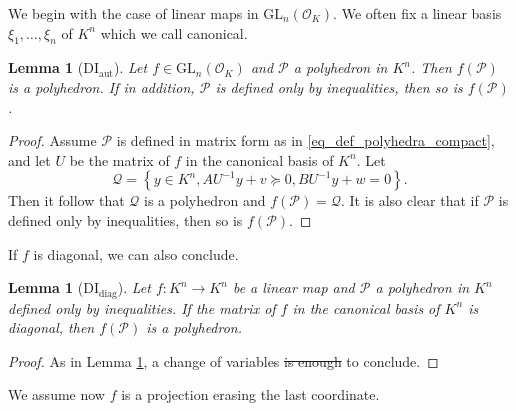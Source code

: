 \documentclass[sigconf]{acmart}
\newcommand{\PP}{\mathcal{P}}
\newcommand{\Qc}{\mathcal{Q}}
\newtheorem{lemma}[theorem]{Lemma}
\newcommand{\OK}{\mathcal{O}_K}
\newcommand{\GL}{\mathrm{GL}}
\providecommand{\DIFaddtex}[1]{{\protect\color{blue}\uwave{#1}}} %
\providecommand{\DIFdeltex}[1]{{\protect\color{red}\sout{#1}}}                      %
\providecommand{\DIFaddbegin}{} %
\providecommand{\DIFaddend}{} %
\providecommand{\DIFdelbegin}{} %
\providecommand{\DIFdelend}{} %
\providecommand{\DIFadd}[1]{\texorpdfstring{\DIFaddtex{#1}}{#1}} %
\providecommand{\DIFdel}[1]{\texorpdfstring{\DIFdeltex{#1}}{}} %
\newcommand{\DIFscaledelfig}{0.5}
\newlength{\DIFdelgraphicswidth} %
\newlength{\DIFdelgraphicsheight} %
\newcommand{\DIFaddincludegraphics}[2][]{{\color{blue}\fbox{\DIFOincludegraphics[#1]{#2}}}} %
\newcommand{\DIFdelincludegraphics}[2][]{%
\sbox{\DIFdelgraphicsbox}{\DIFOincludegraphics[#1]{#2}}%
\settoboxwidth{\DIFdelgraphicswidth}{\DIFdelgraphicsbox} %
\settoboxtotalheight{\DIFdelgraphicsheight}{\DIFdelgraphicsbox} %
\scalebox{\DIFscaledelfig}{%
\parbox[b]{\DIFdelgraphicswidth}{\usebox{\DIFdelgraphicsbox}\\[-\baselineskip] \rule{\DIFdelgraphicswidth}{0em}}\llap{\resizebox{\DIFdelgraphicswidth}{\DIFdelgraphicsheight}{%
\setlength{\unitlength}{\DIFdelgraphicswidth}%
\begin{picture}(1,1)%
\thicklines\linethickness{2pt} %
{\color[rgb]{1,0,0}\put(0,0){\framebox(1,1){}}}%
{\color[rgb]{1,0,0}\put(0,0){\line( 1,1){1}}}%
{\color[rgb]{1,0,0}\put(0,1){\line(1,-1){1}}}%
\end{picture}%
}\hspace*{3pt}}} %
} %
\DeclareRobustCommand{\DIFaddbegin}{\DIFOaddbegin \let\includegraphics\DIFaddincludegraphics} %
\DeclareRobustCommand{\DIFaddend}{\DIFOaddend \let\includegraphics\DIFOincludegraphics} %
\DeclareRobustCommand{\DIFdelbegin}{\DIFOdelbegin \let\includegraphics\DIFdelincludegraphics} %
\DeclareRobustCommand{\DIFdelend}{\DIFOaddend \let\includegraphics\DIFOincludegraphics} %
\begin{document}
We begin with the case of linear maps in $\GL_n(\OK)$.
We often fix a linear basis $\xi_1,\ldots,\xi_n$ of $K^n$ which we call canonical.

\begin{lemma}[DI${}_{\mathrm{aut}}$]
Let $f \in \GL_n(\OK)$ and $\PP$ a polyhedron in $K^n$.
Then $f(\PP)$ is a polyhedron. \label{lem:DIaut}
If in addition, $\PP$ is defined only by inequalities,
then so is $f(\PP)$.
\end{lemma}
\begin{proof}
  Assume $\PP$ is defined in matrix form as in \eqref{eq_def_polyhedra_compact},
  and let $U$ be the matrix of
  $f$ in the canonical basis of $K^n$. Let
  \[\Qc=\left\lbrace y \in K^n,  AU^{-1} y+v \succeq 0, BU^{-1} y+w=0 \right\rbrace.\]
  Then it follow that $\Qc$ is a polyhedron and $f(\PP)=\Qc.$
  It is also clear that if $\PP$ is defined only by inequalities,
  then so is $f(\PP)$.
\end{proof}

If $f$ is diagonal, we can also conclude.

\begin{lemma}[DI${}_{\mathrm{diag}}$]
  Let $f : K^n \to K^n$ be a linear map and $\PP$ a polyhedron in $K^n$ defined only by inequalities.
  If the matrix of $f$ in the canonical basis of $K^n$ is diagonal,
  then $f(\PP)$ is a polyhedron. \label{lem:DIdiag}
\end{lemma}
\begin{proof}
As in Lemma \ref{lem:DIaut}, a change of variables \DIFdelbegin \DIFdel{is enough }\DIFdelend \DIFaddbegin \DIFadd{suffices }\DIFaddend to conclude.
\end{proof}

We assume now $f$ is a projection erasing the last coordinate.
\end{document}
